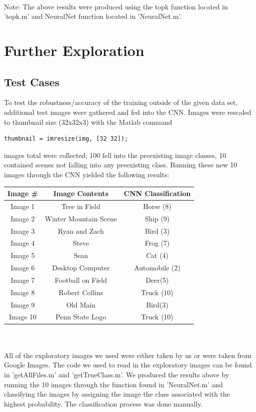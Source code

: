 \documentclass[11pt,english]{article}
\begin{document}
	~\\
	\noindent
	Note: The above results were produced using the topk function located in 'topk.m' and NeuralNet function located in 'NeuralNet.m'.

\section{Further Exploration}
\subsection{Test Cases}
To test the robustness/accuracy of the training outside of the given data set, additional test images were gathered and fed into the CNN.  Images were rescaled to thumbnail size (32x32x3) with the Matlab command
\begin{lstlisting}
thumbnail = imresize(img, [32 32]);
\end{lstlisting}

 images total were collected; 100 fell into the preexisting image classes, 10 contained scenes not falling into any preexisting class.  Running these new 10 images through the CNN yielded the following results:\\

\begin{tabular}{ | c | c | c |}
  \hline
  Image \# & Image Contents & CNN Classification \\
  \hline		
  Image 1 & Tree in Field & Horse (8) \\
  Image 2 & Winter Mountain Scene & Ship (9) \\
  Image 3 & Ryan and Zach & Bird (3) \\
  Image 4 & Steve & Frog (7) \\
  Image 5 & Sean & Cat (4) \\
  Image 6 & Desktop Computer & Automobile (2) \\
  Image 7 & Football on Field & Deer(5) \\
  Image 8 & Robert Collins & Truck (10) \\
  Image 9 & Old Main & Bird(3) \\
  Image 10 & Penn State Logo & Truck (10)\\
  \hline  
\end{tabular}

~\\~\\
\noindent
All of the exploratory images we used were either taken by us or were taken from Google Images. The code we used to read in the exploratory images can be found in 'getAllFiles.m' and 'getTrueClass.m'. We produced the results above by running the 10 images through the function found in 'NeuralNet.m' and classifying the images by assigning the image the class associated with the highest probability. The classification process was done manually.
\end{document}
